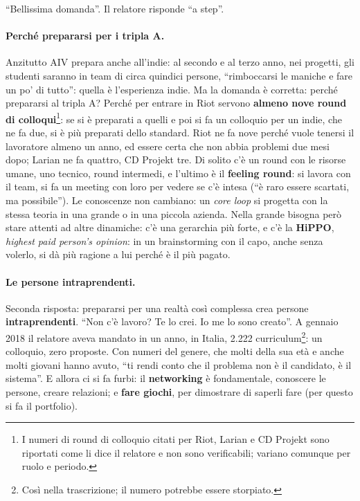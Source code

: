 ``Bellissima domanda''. Il relatore risponde ``a step''.

\paragraph{Perché prepararsi per i tripla A.} Anzitutto AIV prepara anche
all'indie: al secondo e al terzo anno, nei progetti, gli studenti saranno in
team di circa quindici persone, ``rimboccarsi le maniche e fare un po' di
tutto'': quella è l'esperienza indie. Ma la domanda è corretta: perché
prepararsi al tripla A? Perché per entrare in Riot servono \textbf{almeno nove
round di colloqui}\footnote{I numeri di round di colloquio citati per Riot,
Larian e CD Projekt sono riportati come li dice il relatore e non sono
verificabili; variano comunque per ruolo e periodo.}: se si è preparati a quelli
e poi si fa un colloquio per un indie, che ne fa due, si è più preparati dello
standard. Riot ne fa nove perché vuole tenersi il lavoratore almeno un anno, ed
essere certa che non abbia problemi due mesi dopo; Larian ne fa quattro, CD
Projekt tre. Di solito c'è un round con le risorse umane, uno tecnico, round
intermedi, e l'ultimo è il \textbf{feeling round}: si lavora con il team, si fa
un meeting con loro per vedere se c'è intesa (``è raro essere scartati, ma
possibile''). Le conoscenze non cambiano: un \emph{core loop} si progetta con la
stessa teoria in una grande o in una piccola azienda. Nella grande bisogna però
stare attenti ad altre dinamiche: c'è una gerarchia più forte, e c'è la
\textbf{HiPPO}, \emph{highest paid person's opinion}: in un brainstorming con il
capo, anche senza volerlo, si dà più ragione a lui perché è il più pagato.

\paragraph{Le persone intraprendenti.} Seconda risposta: prepararsi per una
realtà così complessa crea persone \textbf{intraprendenti}. ``Non c'è lavoro?
Te lo crei. Io me lo sono creato''. A gennaio 2018 il relatore aveva mandato in
un anno, in Italia, 2.222 curriculum\footnote{Così nella trascrizione; il numero
potrebbe essere storpiato.}: un colloquio, zero proposte. Con numeri del genere,
che molti della sua età e anche molti giovani hanno avuto, ``ti rendi conto che
il problema non è il candidato, è il sistema''. E allora ci si fa furbi: il
\textbf{networking} è fondamentale, conoscere le persone, creare relazioni; e
\textbf{fare giochi}, per dimostrare di saperli fare (per questo si fa il
portfolio).

